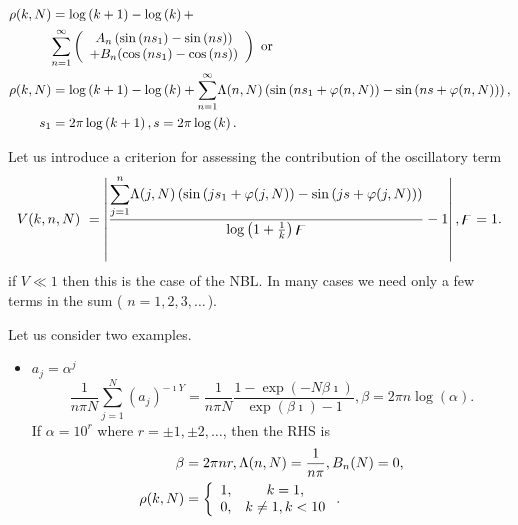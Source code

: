 \documentclass[titlepage,fleqn]{article}%
\begin{document}
\begin{align}
\rho(k,N)  &  =\log\left(  k+1\right)  -\log\left(  k\right)  +\label{Disc3}\\
&
{\displaystyle\sum\limits_{n=1}^{\infty}}
\left(
\begin{array}
[c]{c}%
A_{n}\left(  \sin\left(  ns_{1}\right)  -\sin\left(  ns\right)  \right) \\
+B_{n}(\cos\left(  ns_{1}\right)  -\cos\left(  ns\right)  )
\end{array}
\right)  \text{ or }\nonumber\\
\rho(k,N)  &  =\log\left(  k+1\right)  -\log\left(  k\right)  +%
{\displaystyle\sum\limits_{n=1}^{\infty}}
\Lambda(n,N)\left(  \sin\left(  ns_{1}+\varphi(n,N)\right)  -\sin\left(
ns+\varphi(n,N)\right)  \right)  ,\\
s_{1}  &  =2\pi\log\left(  k+1\right)  ,s=2\pi\log\left(  k\right)  .\nonumber
\end{align}


Let us introduce a criterion for assessing the contribution of the oscillatory
term%
\begin{equation}
V(k,n,N)\ =\left\vert \frac{%
{\displaystyle\sum\limits_{j=1}^{n}}
\Lambda(j,N)\left(  \sin\left(  js_{1}+\varphi(j,N)\right)  -\sin\left(
js+\varphi(j,N)\right)  \right)  }{\log\left(  1+\frac{1}{k}\right)  \digamma
}-1\right\vert ,\digamma=1.
\end{equation}
if $V\ll1$ then this is the case of the NBL. In many cases we need only a few
terms in the sum ( $n=1,2,3,\ldots\frac{{}}{{}}$).

Let us consider two examples.

\begin{itemize}
\item $a_{j}=\alpha^{j}$%
\begin{equation}
\frac{1}{n\pi N}%
{\displaystyle\sum\limits_{j=1}^{N}}
(a_{j})^{-\imath Y}=\frac{1}{n\pi N}\frac{1-\exp(-N\beta\imath)}{\exp
(\beta\imath)-1},\beta=2\pi n\log(\alpha). \label{Disc4}%
\end{equation}
If $\alpha=10^{r}$ where $r=\pm1,\pm2,\ldots$, then the RHS is
\begin{align*}
\beta &  =2\pi nr,\Lambda(n,N)=\frac{1}{n\pi},B_{n}(N)=0,\\
\rho(k,N)  &  =\left\{
\begin{array}
[c]{cc}%
1, & k=1,\\
0, & k\neq1,k<10
\end{array}
\right.  .
\end{align*}

\end{itemize}
\end{document}
